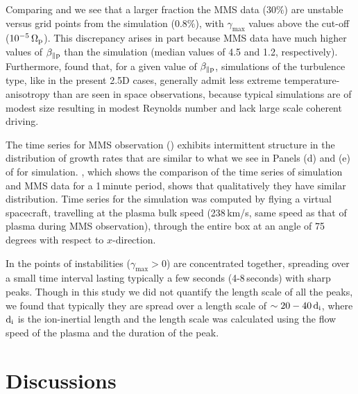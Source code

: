             Comparing  and  we see that a larger fraction the MMS
            data ($30\%$) are unstable versus grid points from the simulation ($0.8\%$), with
            $\gamma_\mathrm{max}$ values above the cut-off ($10^{-5}\,\Omega_{\rm p}$). This
            discrepancy arises in part because MMS data have much higher values of $\beta_{\parallel
            \rm p}$ than the simulation (median values of 4.5 and 1.2, respectively). Furthermore,
            \citet{Servidio2015} found that, for a given value of $\beta_{\parallel \rm p}$,
            simulations of the turbulence type, like in the present 2.5D cases, generally admit less
            extreme temperature-anisotropy than are seen in space observations, because typical
            simulations are of modest size resulting in modest Reynolds number and lack large scale
            coherent driving.

            The time series for MMS observation () exhibits intermittent structure
            in the distribution of growth rates that are similar to what we see in Panels (d) and
            (e) of  for simulation. , which shows the comparison of
            the time series of simulation and MMS data for a 1\,minute period, shows that
            qualitatively they have similar distribution. Time series for the simulation was
            computed by flying a virtual spacecraft, travelling at the plasma bulk speed (238\,km/s,
            same speed as that of plasma during MMS observation), through the entire box at an angle
            of 75 degrees with respect to $x$-direction.

            In  the points of instabilities ($\gamma_\mathrm{max}>0$) are
            concentrated together, spreading over a small time interval lasting typically a few
            seconds (4-8\,seconds) with sharp peaks. Though in this study we did not quantify the
            length scale of all the peaks, we found that typically they are spread over a length
            scale of $\sim 20-40\,\mathrm{d_{\rm i}}$, where $\mathrm{d_{\rm i}}$ is the
            ion-inertial length and the length scale was calculated using the flow speed of the
            plasma and the duration of the peak.

    \section{Discussions} \label{sec:conc5}

